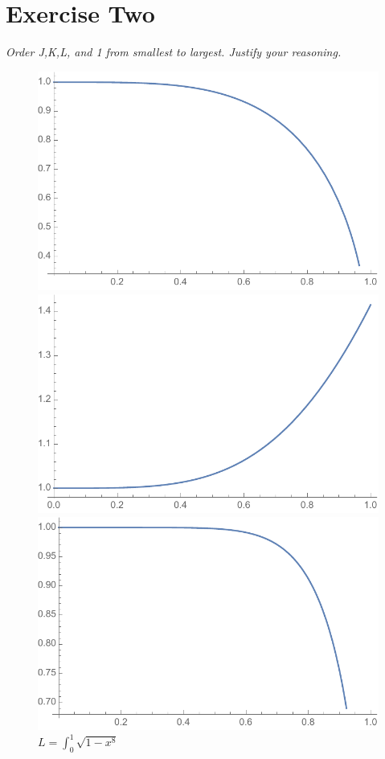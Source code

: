 \documentclass[12pt]{article}
\begin{document}
\section{Exercise Two} 
\textit{Order J,K,L, and 1 from smallest to largest. Justify your reasoning.} \\

\begin{figure}[!htb]
  \includegraphics[width=\linewidth]{2J_graph.pdf}
  \caption{$J = \int_{0}^{1}\sqrt{1-x^4}$}
\endminipage\hfill
{}
  \includegraphics[width=\linewidth]{2K_graph.pdf}
  \caption{$K = \int_{0}^{1}\sqrt{1+x^4}$}
\endminipage\hfill
{}%
  \includegraphics[width=\linewidth]{2L_graph.pdf}
  \caption{$L = \int_{0}^{1}\sqrt{1-x^8}$}
\endminipage
\end{figure}
\end{document}
